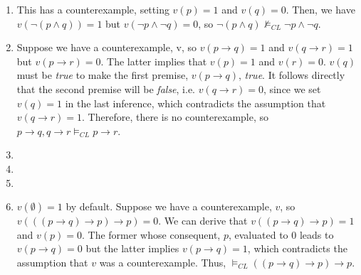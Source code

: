 \begin{enumerate}
\item
This has a counterexample, setting $v(p) = 1$ and $v(q) = 0$. Then, we have $v(\neg (p \land q)) = 1$ but $v(\neg p \land \neg q) = 0$, so $\neg (p \land q) \not\vDash_{CL} \neg p \land \neg q$.

\item
Suppose we have a counterexample, v, so $v(p \to q) = 1$ and $v(q \to r) = 1$ but $v(p \to r) = 0$. The latter implies that $v(p) = 1$ and $v(r) = 0$. $v(q)$ must be \textit{true} to make the first premise, $v(p \to q)$, \textit{true}. It follows directly that the second premise will be \textit{false}, i.e. $v(q \to r) = 0$, since we set $v(q) = 1$ in the last inference, which contradicts the assumption that $v(q \to r) = 1$. Therefore, there is no counterexample, so $p \to q, q \to r \vDash_{CL} p \to r$.

\item

\item

\item

\item
$v(\emptyset) = 1$ by default. Suppose we have a counterexample, $v$, so $v( ((p \to q) \to p) \to p ) = 0$. We can derive that $v((p \to q) \to p) = 1$ and $v(p) = 0$. The former whose consequent, $p$, evaluated to $0$ leads to $v(p \to q) = 0$ but the latter implies $v(p \to q) = 1$, which contradicts the assumption that $v$ was a counterexample. Thus, $\vDash_{CL} ((p \to q) \to p) \to p$.

\end{enumerate}

